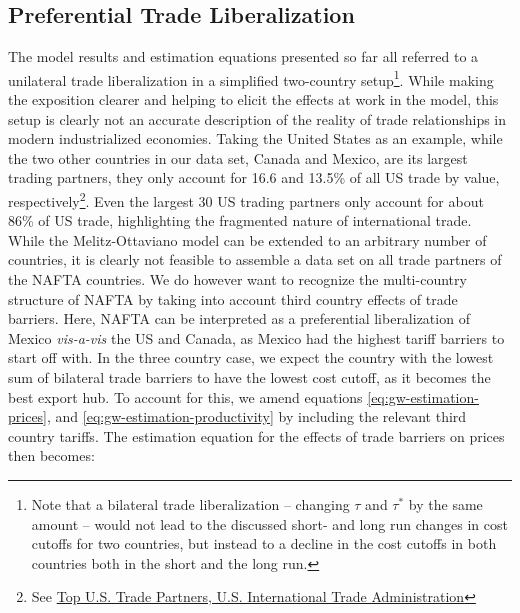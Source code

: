 \subsection{Preferential Trade Liberalization}
The model results and estimation equations presented so far all referred to a 
unilateral trade liberalization in a simplified two-country setup\footnote{Note
 that a bilateral trade liberalization -- changing $\tau$ and
 $\tau^*$ by the same amount -- would not lead to the discussed short- and long 
run changes in cost cutoffs for two countries, but instead to a decline in the cost cutoffs in both countries both in the short and the 
long run.}. While making the exposition clearer and helping to elicit the effects at work in the model, this setup is clearly not an accurate description of the reality of trade relationships in modern industrialized economies. Taking the United States as an example, while the two other countries in our data set, Canada and Mexico, are its largest 
trading partners, they only account for 16.6 and 13.5\% of all US trade by value, 
respectively\footnote{See \href{http://goo.gl/2C0saQ}{Top U.S. Trade Partners, U.S. International Trade Administration}}. 
Even the largest 30 US trading partners only account for about 86\% of US trade, 
highlighting the fragmented nature of international trade. While the Melitz-Ottaviano 
model can be extended to an arbitrary number of countries, it is clearly not 
feasible to assemble a data set on all trade partners of the NAFTA countries. 
We do however want to recognize the multi-country structure of NAFTA by taking 
into account third country effects of trade barriers. Here, NAFTA can be 
interpreted as a preferential liberalization of Mexico \textit{vis-a-vis} the
 US and Canada, as Mexico had the highest tariff barriers to start off with. 
In the three country case, we expect the country with the lowest sum of bilateral
 trade barriers to have the lowest cost cutoff, as it becomes the best export hub.
 To account for this, we amend equations \ref{eq:gw-estimation-prices}, and \ref{eq:gw-estimation-productivity} 
by including the relevant third country tariffs. The estimation equation for 
the effects of trade barriers on prices then becomes:


